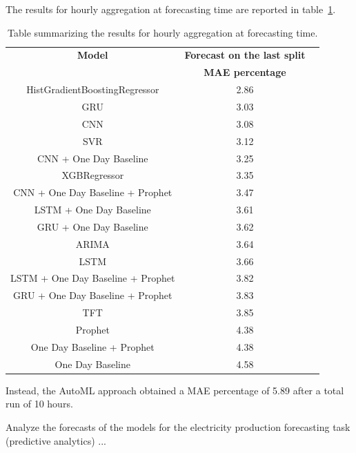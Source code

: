 
The results for hourly aggregation at forecasting time are reported in table~\ref{tab:productionhourlyresultsforecast}.

\begin{table}[H]
\centering
\begin{tabular}{|c|c|c|}
\hline
\textbf{Model} & \textbf{Forecast on the last split}\\
 & \textbf{MAE percentage}\\
\hline
HistGradientBoostingRegressor & 2.86\\
\hline
GRU & 3.03\\
\hline
CNN & 3.08\\
\hline
SVR & 3.12\\
\hline
CNN + One Day Baseline & 3.25\\
\hline
XGBRegressor & 3.35\\
\hline
CNN + One Day Baseline + Prophet & 3.47\\
\hline
LSTM + One Day Baseline & 3.61\\
\hline
GRU + One Day Baseline & 3.62\\
\hline
ARIMA & 3.64\\
\hline
LSTM & 3.66\\
\hline
LSTM + One Day Baseline + Prophet & 3.82\\
\hline
GRU + One Day Baseline + Prophet & 3.83\\
\hline
TFT & 3.85\\
\hline
Prophet & 4.38\\
\hline
One Day Baseline + Prophet & 4.38\\
\hline
One Day Baseline & 4.58\\
\hline
\end{tabular}
\caption{Table summarizing the results for hourly aggregation at forecasting time.}
\label{tab:productionhourlyresultsforecast}
\end{table}

Instead, the AutoML approach obtained a MAE percentage of 5.89 after a total run of 10 hours.

Analyze the forecasts of the models for the electricity production forecasting task (predictive analytics) ...



